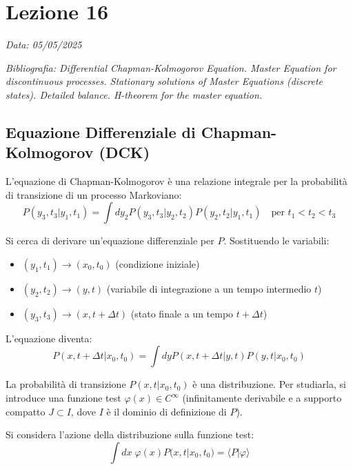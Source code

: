\chapter{Lezione 16}
\label{chap:lezione_16} %

\begin{flushright}
\textit{Data: 05/05/2025}
\end{flushright}
\textit{Bibliografia: 
Differential Chapman-Kolmogorov Equation. Master Equation for discontinuous processes. Stationary solutions of Master Equations (discrete states). Detailed balance. H-theorem for the master equation.}

\section{Equazione Differenziale di Chapman-Kolmogorov (DCK)}

L'equazione di Chapman-Kolmogorov è una relazione integrale per la probabilità di transizione di un processo Markoviano:
\begin{equation}
P(y_3,t_3|y_1,t_1) = \int dy_2 P(y_3,t_3|y_2,t_2)P(y_2,t_2|y_1,t_1) \quad \text{per } t_1 < t_2 < t_3
\end{equation}

Si cerca di derivare un'equazione differenziale per $P$. Sostituendo le variabili:
\begin{itemize}
    \item $(y_1,t_1) \rightarrow (x_0,t_0)$ (condizione iniziale)
    \item $(y_2,t_2) \rightarrow (y,t)$ (variabile di integrazione a un tempo intermedio $t$)
    \item $(y_3,t_3) \rightarrow (x, t+\Delta t)$ (stato finale a un tempo $t+\Delta t$)
\end{itemize}

L'equazione diventa:
\begin{equation}
P(x,t+\Delta t|x_0,t_0) = \int dy P(x,t+\Delta t|y,t)P(y,t|x_0,t_0)
\label{eq:CK_base}
\end{equation}

La probabilità di transizione $P(x, t | x_0, t_0)$ è una distribuzione. Per studiarla, si introduce una funzione test $\varphi(x) \in C^\infty$ (infinitamente derivabile e a supporto compatto $J \subset I$, dove $I$ è il dominio di definizione di $P$).

Si considera l'azione della distribuzione sulla funzione test:
\begin{equation}
\int dx \; \varphi(x) P(x,t|x_0,t_0) = \langle P| \varphi \rangle 
\end{equation}

